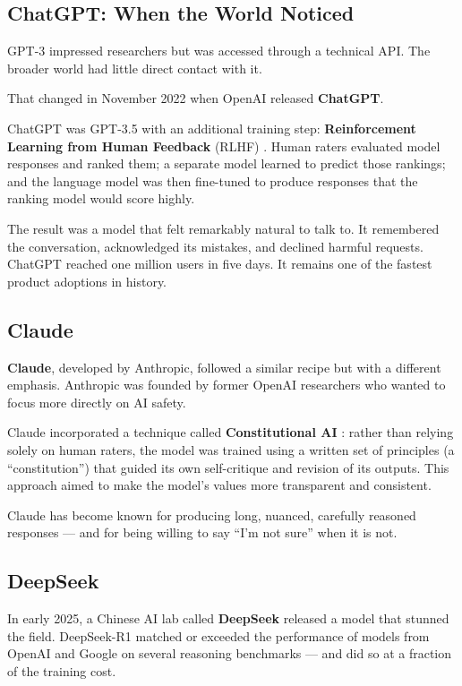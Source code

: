 \subsection{ChatGPT: When the World Noticed}

GPT-3 impressed researchers but was accessed through a technical API.
The broader world had little direct contact with it.

That changed in November 2022 when OpenAI released \textbf{ChatGPT}.

ChatGPT was GPT-3.5 with an additional training step: \textbf{Reinforcement Learning from Human Feedback} (RLHF) \cite{ouyang2022training}.
Human raters evaluated model responses and ranked them; a separate model learned to predict those rankings; and the language model was then fine-tuned to produce responses that the ranking model would score highly.

The result was a model that felt remarkably natural to talk to.
It remembered the conversation, acknowledged its mistakes, and declined harmful requests.
ChatGPT reached one million users in five days.
It remains one of the fastest product adoptions in history.

\subsection{Claude}

\textbf{Claude}, developed by Anthropic, followed a similar recipe but with a different emphasis.
Anthropic was founded by former OpenAI researchers who wanted to focus more directly on AI safety.

Claude incorporated a technique called \textbf{Constitutional AI} \cite{bai2022constitutional}: rather than relying solely on human raters, the model was trained using a written set of principles (a ``constitution'') that guided its own self-critique and revision of its outputs.
This approach aimed to make the model's values more transparent and consistent.

Claude has become known for producing long, nuanced, carefully reasoned responses --- and for being willing to say ``I'm not sure'' when it is not.

\subsection{DeepSeek}

In early 2025, a Chinese AI lab called \textbf{DeepSeek} released a model that stunned the field.
DeepSeek-R1 \cite{deepseek2025r1} matched or exceeded the performance of models from OpenAI and Google on several reasoning benchmarks --- and did so at a fraction of the training cost.

